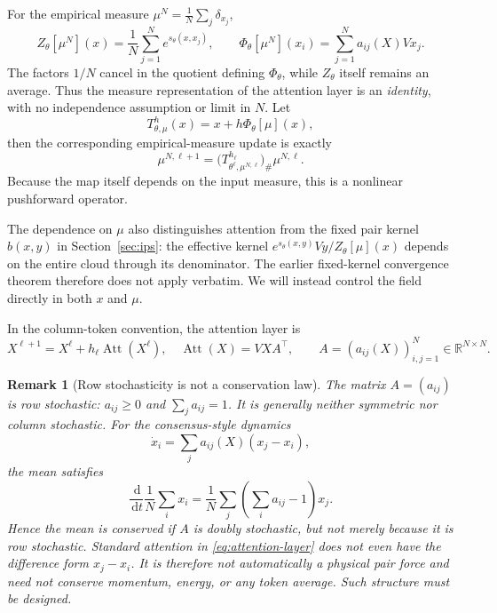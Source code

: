 \documentclass[11pt]{amsart}
\numberwithin{equation}{section}
\theoremstyle{plain}
\newtheorem{remark}[theorem]{Remark}
\newcommand{\R}{\mathbb{R}}
\newcommand{\dd}{\,\mathrm{d}}
\begin{document}
For the empirical measure $\mu^N=\frac1N\sum_j\delta_{x_j}$,
\begin{equation}\label{eq:attention-exact}
  Z_\theta[\mu^N](x)=\frac1N\sum_{j=1}^N e^{s_\theta(x,x_j)},\qquad
  \Phi_\theta[\mu^{N}](x_i)
  =\sum_{j=1}^N a_{ij}(X)Vx_j.
\end{equation}
The factors $1/N$ cancel in the quotient defining $\Phi_\theta$, while
$Z_\theta$ itself remains an average.  Thus the measure representation of the
attention layer is an \emph{identity}, with no independence assumption or
limit in $N$.  Let
\[
  T_{\theta,\mu}^{h}(x)=x+h\Phi_\theta[\mu](x),
\]
then the corresponding empirical-measure update is exactly
\begin{equation}\label{eq:attention-pushforward}
    \mu^{N,\ell+1}
    =\bigl(T_{\theta^\ell,\mu^{N,\ell}}^{h_\ell}\bigr)_\#
      \mu^{N,\ell}.
\end{equation}
Because the map itself depends on the input measure, this is a nonlinear
pushforward operator.

The dependence on $\mu$ also distinguishes attention from the fixed pair
kernel $b(x,y)$ in Section~\ref{sec:ips}: the effective kernel
$e^{s_\theta(x,y)}Vy/Z_\theta[\mu](x)$ depends on the entire cloud through
its denominator.  The earlier fixed-kernel convergence theorem therefore
does not apply verbatim.  We will instead control the field directly in both
$x$ and $\mu$.

In the column-token convention, the attention layer is
\begin{equation}\label{eq:attention-matrix}
 X^{\ell+1}=X^\ell+h_\ell\operatorname{Att}(X^\ell), \quad  \operatorname{Att}(X)=VXA^\top,\qquad
  A=(a_{ij}(X))_{i,j=1}^N\in \R^{N\times N}.
\end{equation}

\begin{remark}[Row stochasticity is not a conservation law]
The matrix $A=(a_{ij})$ is row stochastic:
$a_{ij}\geq0$ and $\sum_j a_{ij}=1$.  It is generally neither symmetric nor
column stochastic.  For the consensus-style dynamics
\begin{equation}\label{eq:attn-consensus-form}
  \dot x_i=\sum_j a_{ij}(X)(x_j-x_i),
\end{equation}
the mean satisfies
\[
  \frac{\dd}{\dd t}\frac1N\sum_ix_i
  =\frac1N\sum_j\left(\sum_i a_{ij}-1\right)x_j.
\]
Hence the mean is conserved if $A$ is doubly stochastic, but not merely because
it is row stochastic.  Standard attention in
\eqref{eq:attention-layer} does not even have the difference form
$x_j-x_i$.  It is therefore not automatically a physical pair force and need
not conserve momentum, energy, or any token average.  Such structure must be
designed.
\end{remark}
\end{document}
